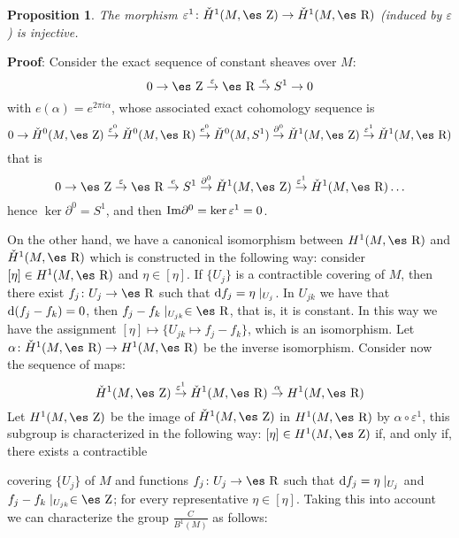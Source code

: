 \documentclass[12pt]{article}
\theoremstyle{plain}
\newtheorem{prop}{Proposition}
\def\dst{\(}
\def\map#1{\mathrel{\mathop{\to}\limits^{#1}}}
\def\qed{\ifvmode\removelastskip\fi
{\unskip\nobreak\hfil\penalty50\hbox{}\nobreak\hfil
\hbox{\vrule height1.2ex width1.2ex}\parfillskip=0pt
\finalhyphendemerits=0 \par\smallskip}}
\def\d{{\rm d}}
\def\Zahl{\mbox{\es Z}}
\def\Real{\mbox{\es R}}
\begin{document}
\begin{prop}
The morphism
$\varepsilon^1 \colon \check H^1(M,\Zahl ) \to \check H^1(M,\Real )$
(induced by $\varepsilon$) is injective.
\end{prop}
{\bf Proof}: 
Consider the exact sequence of constant sheaves over $M$:
$$
0 \to \Zahl \map{\varepsilon} \Real \map{e} S^1 \to 0
$$
with $e(\alpha )= e^{2\pi i \alpha}$,
whose associated exact cohomology sequence is
$$
0 \to \check H^0(M,\Zahl ) \map{\varepsilon^0}
\check H^0(M,\Real ) \map{e^0}
\check H^0(M,S^1) \map{\partial^0}
\check H^1(M,\Zahl ) \map{\varepsilon^1}
\check H^1(M,\Real )
$$
that is
$$
0 \to \Zahl \map{\varepsilon} \Real \map{e} S^1
\map{\partial^0}
\check H^1(M,\Zahl ) \map{\varepsilon^1}
\check H^1(M,\Real ) \ldots
$$
hence $\ker \partial^0 = S^1$, and then
${\rm Im} \partial^0 =\ker \varepsilon^1 = 0$.
\qed

On the other hand,
we have a  canonical isomorphism between
$H^1(M,\Real )$ and $\check H^1(M,\Real )$
which is constructed in the following way:
consider $[\eta ] \in H^1(M,\Real )$
and $\eta \in [\eta ]$.
If $\{ U_j \}$ is a contractible covering of $M$, then there exist
$f_j \colon U_j \to \Real$ such that $\d f_j = \eta\mid_{U_j}$.
In $U_{jk}$ we have that $\d (f_j - f_k) = 0$,
then $f_j-f_k \mid_{U_{jk}} \in \Real$, that is, it is constant.
In this way we have the assignment
$[\eta] \mapsto \{ U_{jk} \mapsto f_j - f_k \}$, which is an
isomorphism.
Let $\alpha \colon \check H^1(M,\Real ) \to H^1(M,\Real )$ be
the inverse isomorphism.
Consider now the sequence of maps:
$$
\check H^1(M,\Zahl ) \map{\varepsilon^1}
\check H^1(M,\Real ) \map{\alpha}
H^1(M,\Real )
$$
Let $H^1(M,\Zahl )$ be the image of
$\check H^1(M,\Zahl )$ in $H^1(M,\Real )$
by $\alpha \circ \varepsilon^1$,
this subgroup is characterized in the following way:
$[\eta ] \in H^1(M,\Zahl )$ if, and only if, there exists a contractible

covering
$\{ U_j \}$ of $M$ and functions $f_j \colon U_j \to \Real$ such that
$\d f_j = \eta \mid_{U_j}$ and $f_j-f_k \mid_{U_{jk}} \in \Zahl$;
for every representative $\eta \in [\eta ]$.
Taking this into account we can characterize the group
\dst\frac{C}{B^1(M)}\) as follows:
\end{document}

